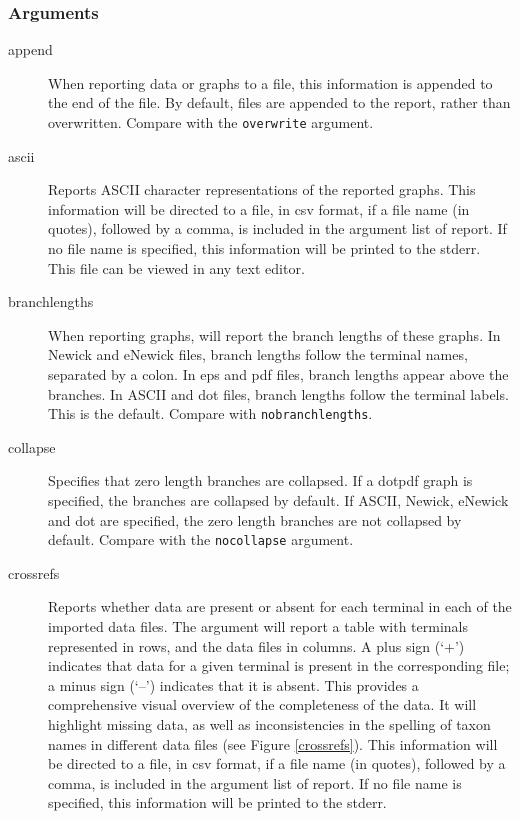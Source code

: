 	\subsubsection{Arguments}
	\begin{description}
		
		\item[append] When reporting data or graphs to a file, this information is 
		appended to the end of the file. By default, files are appended to the report, 
		rather than overwritten. Compare with the \texttt{overwrite} argument.

		\item[ascii] Reports ASCII character representations of the reported graphs.
		This information will be directed to a file, in csv format, if a file name (in quotes), 
		followed by a comma, is included in the argument list of report. If no file name is 
		specified, this information will be printed to the stderr. This file can be viewed 
		in any text editor. 
		
		\item[branchlengths] When reporting graphs, \phyg will report the branch 
		lengths of these graphs. In Newick and eNewick files, branch lengths 
		follow the terminal names, separated by a colon. In eps and pdf files, 
		branch lengths appear above the branches. In ASCII and dot files, branch 
		lengths follow the terminal labels. This is the default. Compare with 
		\texttt{nobranchlengths}. 

		\item[collapse] Specifies that zero length branches are collapsed. If a dotpdf 
		graph is specified, the branches are collapsed by default. If ASCII, Newick, 
		eNewick and dot are specified, the zero length branches are not collapsed by 
		default. Compare with the \texttt{nocollapse} argument.  		
		
		\item[crossrefs] Reports whether data are present or absent for each terminal 
		in each of the imported data files. The argument will report a table with terminals 
		represented in rows, and the data files in columns. A plus sign (`+') indicates that 
		data for a given terminal is present in the corresponding file; a minus sign (`--') 
		indicates that it is absent. This provides a comprehensive visual overview of the 
		completeness of the data. It will highlight missing data, as well as inconsistencies 
		in the spelling of taxon names in different data files (see Figure \ref{crossrefs}).  
		This information will be directed to a file, in csv format, if a file name (in quotes), 
		followed by a comma, is included in the argument list of report. If no file name is 
		specified, this information will be printed to the stderr.
		

\end{description}
